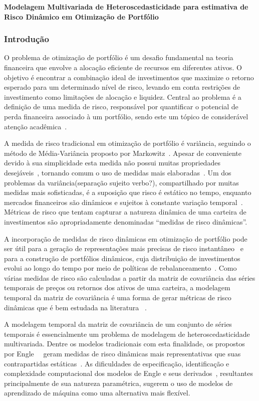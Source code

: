 \documentclass[a4paper, 12pt]{article}
\begin{document}
\textbf{Modelagem Multivariada de Heteroscedasticidade para estimativa de Risco
Dinâmico em Otimização de Portfólio}

\subsubsection*{Introdução}

O problema de otimização de portfólio é um desafio fundamental na teoria
financeira que envolve a alocação eficiente de recursos em diferentes ativos. O
objetivo é encontrar a combinação ideal de investimentos que maximize o retorno
esperado para um determinado nível de risco, levando em conta restrições de
investimento como limitações de alocação e liquidez. Central ao problema é a
definição de uma medida de risco, responsável por quantificar o potencial de
perda financeira associado à um portfólio, sendo este um tópico de considerável
atenção acadêmica~\cite{best_risk_measure, righi2018, hoe2010, ramos2023}.

A medida de risco tradicional em otimização de portfólio é variância, seguindo
o método de Média-Variância proposto por Markowitz~\cite{markowitz}. Apesar de
conveniente devido à sua simplicidade esta medida não possui muitas
propriedades desejáveis~\cite{rockafellar2002deviation}, tornando comum o uso
de medidas mais elaboradas~\cite{gambrah2014risk, sereda, adam2008spectral}. Um
dos problemas da variância(separação sujeito verbo?), compartilhado por muitas
medidas mais sofisticadas, é a suposição que risco é estático no tempo,
enquanto mercados financeiros são dinâmicos e sujeitos à constante variação
temporal~\cite{procacci}. Métricas de risco que tentam capturar a natureza
dinâmica de uma carteira de investimentos são apropriadamente denominadas
``medidas de risco dinâmicas''.

A incorporação de medidas de risco dinâmicas em otimização de portfólio pode
ser útil para a geração de representações mais precisas de risco
instantâneo~\cite{weirum} e para a construção de portfólios dinâmicos, cuja
distribuição de investimentos evolui ao longo do tempo por meio de políticas de
rebalanceamento~\cite{metin, holten}. Como várias medidas de risco são
calculadas a partir da matriz de covariância das séries temporais de preços ou
retornos dos ativos de uma carteira, a modelagem temporal da matriz de
covariância é uma forma de gerar métricas de risco dinâmicas que é bem estudada
na literatura ~\cite{zakamulin2015test, chan1999portfolio}.

A modelagem temporal da matriz de covariância de um conjunto de séries
temporais é essencialmente um problema de modelagem de heteroscedasticidade
multivariada. Dentre os modelos tradicionais com esta finalidade, os propostos
por Engle~\cite{var_garch}~\cite{dcc} geram medidas de risco dinâmicas mais
representativas que suas contrapartidas estáticas~\cite{metin, holten, weirum}.
As dificuldades de especificação, identificação e complexidade computacional
dos modelos de Engle e seus derivados~\cite{silvennoinen2009multivariate},
resultantes principalmente de sua natureza paramétrica, sugerem o uso de
modelos de aprendizado de máquina como uma alternativa mais flexível.
\end{document}
